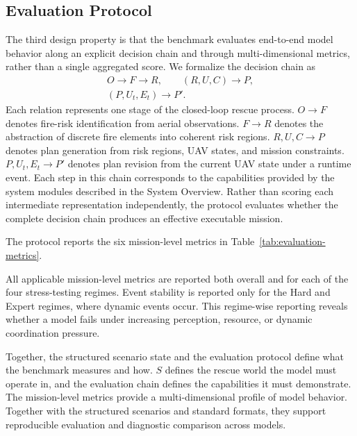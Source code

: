 \subsection{Evaluation Protocol}
The third design property is that the benchmark evaluates end-to-end model
behavior along an explicit decision chain and through multi-dimensional metrics,
rather than a single aggregated score. We formalize the decision chain as
\[
\begin{gathered}
O \rightarrow F \rightarrow R,\qquad (R,U,C) \rightarrow P, \\
(P,U_t,E_t) \rightarrow P'.
\end{gathered}
\]
Each relation represents one stage of the closed-loop rescue process.
$O \rightarrow F$ denotes fire-risk identification from aerial observations.
$F \rightarrow R$ denotes the abstraction of discrete fire elements
into coherent risk regions.
$R, U, C \rightarrow P$ denotes plan generation
from risk regions, UAV states, and mission constraints.
$P, U_t, E_t \rightarrow P'$ denotes plan revision from the current UAV
state under a runtime event.
Each step in this chain corresponds to the capabilities
provided by the system modules described in the System Overview.
Rather than scoring each intermediate representation independently, the protocol
evaluates whether the complete decision chain produces an effective executable
mission.

The protocol reports the six mission-level metrics in
Table~\ref{tab:evaluation-metrics}.



All applicable mission-level metrics are reported both overall and for each of
the four stress-testing regimes. Event stability is reported only for the Hard
and Expert regimes, where dynamic events occur. This regime-wise reporting
reveals whether a model fails under increasing perception, resource, or dynamic
coordination pressure.

Together, the structured scenario state and the evaluation protocol
define what the benchmark measures and how.
$S$ defines the rescue world the model must operate in, and the evaluation chain
defines the capabilities it must demonstrate. The mission-level metrics provide
a multi-dimensional profile of model behavior. Together with the structured
scenarios and standard formats, they support reproducible evaluation and
diagnostic comparison across models.

\endinput
